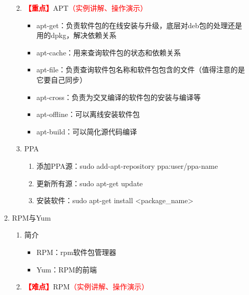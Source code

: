 \documentclass{TIJMUjiaoanLL}
\begin{document}
\begin{enumerate}
\begin{enumerate}
\begin{enumerate}
\otherTail
\newpage
\otherHeader

	  \item \textcolor{red}{\textbf{【重点】}}APT\textcolor{red}{（实例讲解、操作演示）}
	    \begin{itemize}
	      \item apt-get：负责软件包的在线安装与升级，底层对deb包的处理还是用的dpkg，解决依赖关系
              \item apt-cache：用来查询软件包的状态和依赖关系
              \item apt-file：负责查询软件包名称和软件包包含的文件（值得注意的是它要自己同步）
              \item apt-cross：负责为交叉编译的软件包的安装与编译等
	      \item apt-offline：可以离线安装软件包
              \item apt-build：可以简化源代码编译
            \end{itemize}
	  \item PPA
	    \begin{enumerate}
              \item 添加PPA源：sudo add-apt-repository ppa:user/ppa-name
	      \item 更新所有源：sudo apt-get update
	      \item 安装软件：sudo apt-get install <package\_name>
	    \end{enumerate}
	\end{enumerate}
      \item RPM与Yum
	\begin{enumerate}
	  \item 简介
	    \begin{itemize}
	      \item RPM：rpm软件包管理器
	      \item Yum：RPM的前端
	    \end{itemize}
	  \item \textcolor{red}{\textbf{【难点】}}RPM\textcolor{red}{（实例讲解、操作演示）}
	    \begin{itemize}
	    \vspace*{-10pt}
\end{itemize}
\end{enumerate}
\end{enumerate}
\end{enumerate}
\end{document}
